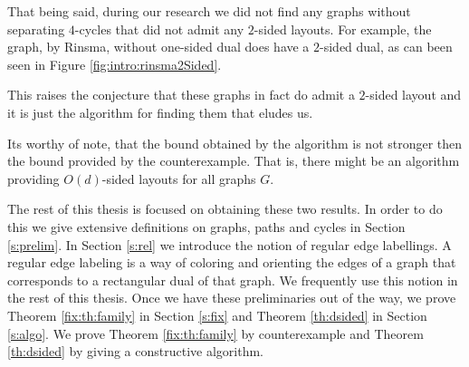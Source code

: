   That being said, during our research we did not find any graphs without separating $4$-cycles that did not admit any $2$-sided layouts.
  For example, the graph, by Rinsma, without one-sided dual does have a $2$-sided dual, as can been seen in Figure \ref{fig:intro:rinsma2Sided}.

  This raises the conjecture that these graphs in fact do admit a $2$-sided layout and it is just the algorithm for finding them that eludes us.

  Its worthy of note, that the bound obtained by the algorithm is not stronger then the bound provided by the counterexample. That is, there might be an algorithm providing $O(d)$-sided layouts for all graphs $G$.

  The rest of this thesis is focused on obtaining these two results.
  In order to do this we give extensive definitions on graphs, paths and cycles in Section \ref{s:prelim}. In Section \ref{s:rel} we introduce the notion of regular edge labellings.  A regular edge labeling is a way of coloring and orienting the edges of a graph that corresponds to a rectangular dual of that graph.
  We frequently use this notion in the rest of this thesis.
  Once we have these preliminaries out of the way, we prove Theorem \ref{fix:th:family} in Section \ref{s:fix} and Theorem \ref{th:dsided} in Section \ref{s:algo}. We prove Theorem \ref{fix:th:family} by counterexample and Theorem \ref{th:dsided} by giving a constructive algorithm.
